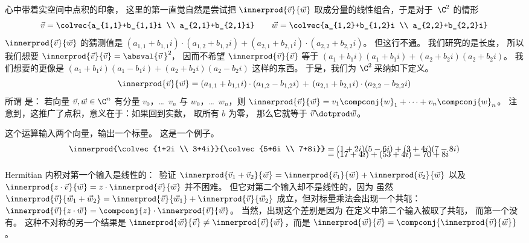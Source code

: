 心中带着实空间中点积的印象，
这里的第一直觉自然是尝试把
$\innerprod{\vec{v}}{\vec{w}}$
取成分量的线性组合，于是对于~$\C^2$
的情形
\begin{equation*}
  \vec{v}=\colvec{a_{1,1}+b_{1,1}i \\ a_{2,1}+b_{2,1}i}
  \qquad
  \vec{w}=\colvec{a_{1,2}+b_{1,2}i \\ a_{2,2}+b_{2,2}i}
\end{equation*}
$\innerprod{\vec{v}}{\vec{w}}$ 的猜测值是
$(a_{1,1}+b_{1,1}i)\cdot(a_{1,2}+b_{1,2}i)+(a_{2,1}+b_{2,1}i)\cdot(a_{2,2}+b_{2,2}i)$。
但这行不通。
我们研究的是长度，
所以我们想要 $\innerprod{\vec{v}}{\vec{v}}=\absval{\vec{v}\,}^2\!$，
因而不希望 $\innerprod{\vec{v}}{\vec{v}}$ 等于
$(a_1+b_1i)(a_1+b_1i)+(a_2+b_2i)(a_2+b_2i)$。
我们想要的更像是
$(a_1+b_1i)(a_1-b_1i)+(a_2+b_2i)(a_2-b_2i)$ 这样的东西。
于是，我们为 $\C^2\!$ 采纳如下定义。
\begin{equation*}
  \innerprod{\vec{v}}{\vec{w}}
  =(a_{1,1}+b_{1,1}i)\cdot(a_{1,2}-b_{1,2}i)\,+\,(a_{2,1}+b_{2,1}i)\cdot(a_{2,2}-b_{2,2}i)
\end{equation*}
所谓
是：
若向量 $\vec{v},\vec{w}\in\C^n$
有分量 $v_0$，\ldots~$v_n$ 与 $w_0$，\ldots~$w_n$，则
$\innerprod{\vec{v}}{\vec{w}}=v_1\compconj{w}_1+\cdots+v_n\compconj{w}_n$。
注意到，这推广了点积，意义在于：如果回到实数，
取所有 $b$ 为零，
那么它就等于 $\vec{v}\dotprod\vec{w}$。

这个运算输入两个向量，输出一个标量。
这是一个例子。
\begin{align*}
  \innerprod{\colvec{1+2i \\ 3+4i}}{\colvec{5+6i \\ 7+8i}}
  &=(1+2i)(5-6i)+(3+4i)(7-8i)                     \\[-2ex]
  &=(17+4i)+(53+4i)=70+8i
\end{align*}

Hermitian 内积对第一个输入是线性的：~验证
$\innerprod{\vec{v}_1+\vec{v}_2}{\vec{w}}
 = \innerprod{\vec{v}_1}{\vec{w}}
   +\innerprod{\vec{v}_2}{\vec{w}}$
以及
$\innerprod{z\cdot\vec{v}}{\vec{w}}
     =z\cdot\innerprod{\vec{v}}{\vec{w}}$
并不困难。
但它对第二个输入却不是线性的，因为
虽然
$\innerprod{\vec{v}}{\vec{w}_1+\vec{w}_2}
 = \innerprod{\vec{v}}{\vec{w}_1}
   +\innerprod{\vec{v}}{\vec{w}_2}$
成立，但对标量乘法会出现一个共轭：
$\innerprod{\vec{v}}{z\cdot\vec{w}}
     =\compconj{z}\cdot\innerprod{\vec{v}}{\vec{w}}$。
当然，出现这个差别是因为
在定义中第二个输入被取了共轭，
而第一个没有。
这种不对称的另一个结果是
$\innerprod{\vec{w}}{\vec{v}}\neq \innerprod{\vec{v}}{\vec{w}}$，而是
$\innerprod{\vec{w}}{\vec{v}}=\compconj{\innerprod{\vec{v}}{\vec{w}}}$。

